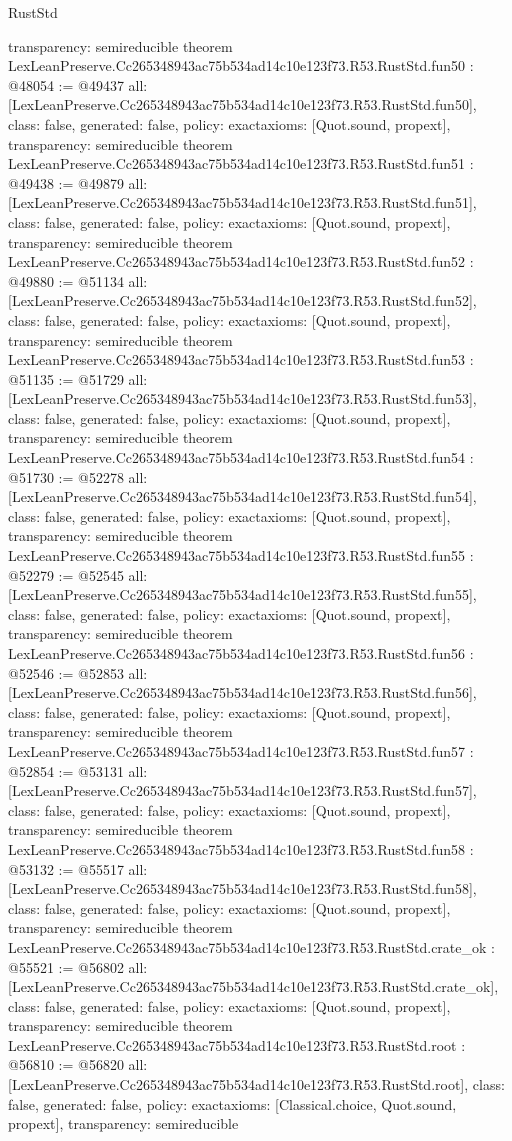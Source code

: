 \begin{lexlean}{RustStd}
\begin{coremodule}
{  transparency: semireducible
}
theorem LexLeanPreserve.Cc265348943ac75b534ad14c10e123f73.R53.RustStd.fun50 : @48054 := @49437 {
  all: [LexLeanPreserve.Cc265348943ac75b534ad14c10e123f73.R53.RustStd.fun50],
  class: false,
  generated: false,
  policy: exact{axioms: [Quot.sound, propext]},
  transparency: semireducible
}
theorem LexLeanPreserve.Cc265348943ac75b534ad14c10e123f73.R53.RustStd.fun51 : @49438 := @49879 {
  all: [LexLeanPreserve.Cc265348943ac75b534ad14c10e123f73.R53.RustStd.fun51],
  class: false,
  generated: false,
  policy: exact{axioms: [Quot.sound, propext]},
  transparency: semireducible
}
theorem LexLeanPreserve.Cc265348943ac75b534ad14c10e123f73.R53.RustStd.fun52 : @49880 := @51134 {
  all: [LexLeanPreserve.Cc265348943ac75b534ad14c10e123f73.R53.RustStd.fun52],
  class: false,
  generated: false,
  policy: exact{axioms: [Quot.sound, propext]},
  transparency: semireducible
}
theorem LexLeanPreserve.Cc265348943ac75b534ad14c10e123f73.R53.RustStd.fun53 : @51135 := @51729 {
  all: [LexLeanPreserve.Cc265348943ac75b534ad14c10e123f73.R53.RustStd.fun53],
  class: false,
  generated: false,
  policy: exact{axioms: [Quot.sound, propext]},
  transparency: semireducible
}
theorem LexLeanPreserve.Cc265348943ac75b534ad14c10e123f73.R53.RustStd.fun54 : @51730 := @52278 {
  all: [LexLeanPreserve.Cc265348943ac75b534ad14c10e123f73.R53.RustStd.fun54],
  class: false,
  generated: false,
  policy: exact{axioms: [Quot.sound, propext]},
  transparency: semireducible
}
theorem LexLeanPreserve.Cc265348943ac75b534ad14c10e123f73.R53.RustStd.fun55 : @52279 := @52545 {
  all: [LexLeanPreserve.Cc265348943ac75b534ad14c10e123f73.R53.RustStd.fun55],
  class: false,
  generated: false,
  policy: exact{axioms: [Quot.sound, propext]},
  transparency: semireducible
}
theorem LexLeanPreserve.Cc265348943ac75b534ad14c10e123f73.R53.RustStd.fun56 : @52546 := @52853 {
  all: [LexLeanPreserve.Cc265348943ac75b534ad14c10e123f73.R53.RustStd.fun56],
  class: false,
  generated: false,
  policy: exact{axioms: [Quot.sound, propext]},
  transparency: semireducible
}
theorem LexLeanPreserve.Cc265348943ac75b534ad14c10e123f73.R53.RustStd.fun57 : @52854 := @53131 {
  all: [LexLeanPreserve.Cc265348943ac75b534ad14c10e123f73.R53.RustStd.fun57],
  class: false,
  generated: false,
  policy: exact{axioms: [Quot.sound, propext]},
  transparency: semireducible
}
theorem LexLeanPreserve.Cc265348943ac75b534ad14c10e123f73.R53.RustStd.fun58 : @53132 := @55517 {
  all: [LexLeanPreserve.Cc265348943ac75b534ad14c10e123f73.R53.RustStd.fun58],
  class: false,
  generated: false,
  policy: exact{axioms: [Quot.sound, propext]},
  transparency: semireducible
}
theorem LexLeanPreserve.Cc265348943ac75b534ad14c10e123f73.R53.RustStd.crate_ok : @55521 := @56802 {
  all: [LexLeanPreserve.Cc265348943ac75b534ad14c10e123f73.R53.RustStd.crate_ok],
  class: false,
  generated: false,
  policy: exact{axioms: [Quot.sound, propext]},
  transparency: semireducible
}
theorem LexLeanPreserve.Cc265348943ac75b534ad14c10e123f73.R53.RustStd.root : @56810 := @56820 {
  all: [LexLeanPreserve.Cc265348943ac75b534ad14c10e123f73.R53.RustStd.root],
  class: false,
  generated: false,
  policy: exact{axioms: [Classical.choice, Quot.sound, propext]},
  transparency: semireducible
}


\end{coremodule}
\end{lexlean}
